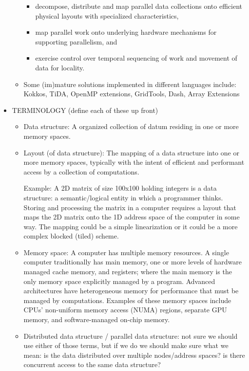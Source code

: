 \begin{itemize}
\begin{itemize}
    \begin{itemize}
    \item decompose, distribute and map parallel data collections onto efficient physical layouts with specialized characteristics, 
    \item map parallel work onto underlying hardware mechanisms for supporting parallelism, and 
    \item exercise control over temporal sequencing of work and movement of data for locality.
    \end{itemize}
  \item Some (im)mature solutions implemented in different languages include: Kokkos, TiDA, OpenMP extensions, GridTools, Dash, Array Extensions
\end{itemize}


\item TERMINOLOGY (define each of these up front)
  \begin{itemize}

 \item Data structure: A organized collection of datum residing in one or more memory spaces. 

  \item Layout (of data structure):
    The mapping of a data structure into one or more memory spaces, typically with the intent of efficient and performant access by a collection of computations.

    Example: A 2D matrix of size 100x100 holding integers is a data structure: a semantic/logical entity in which a programmer thinks. Storing and processing the matrix in a computer requires a layout that maps the 2D matrix onto the 1D address space of the computer in some way. The mapping could be a simple linearization or it could be a more complex blocked (tiled) scheme.

  \item Memory space: A computer has multiple memory resources.  A single computer traditionally has main memory, one or more levels of hardware managed cache memory, and registers; where the main memory is the only memory space explicitly managed by a program.  Advanced architectures have heterogeneous memory for performance that must be managed by computations.  Examples of these memory spaces include CPUs' non-uniform memory access (NUMA) regions, separate GPU memory, and software-managed on-chip memory.

 
  \item Distributed data structure / parallel data structure: not sure we should use either of those terms, but if we do we should make sure what we mean: is the data distributed over multiple nodes/address spaces? is there concurrent access to the same data structure? 
      

\end{itemize}
\end{itemize}
